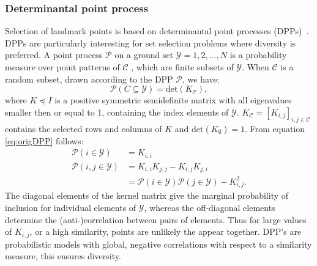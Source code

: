 \documentclass[preprint,12pt]{elsarticle}
\begin{document}
	\subsubsection{Determinantal point process}
	Selection of landmark points is based on determinantal point processes (DPPs)~\cite{kulesza2012determinantal}. DPPs are particularly interesting for set selection problems where diversity is preferred. A point process $\mathcal{P}$ on a ground set $\mathcal{Y} = {1,2,...,N}$ is a probability measure over point patterns of $\mathcal{C}$ , which are finite subsets of $\mathcal{Y}$. When $\mathcal{C}$ is a random subset, drawn according to the DPP $\mathcal{P}$, we have:
	\begin{equation}
	\label{eq:origDPP}
	\mathcal{P}(C \subseteq \mathcal{Y}) = \mathrm{det}(K_{\mathcal{C}}),
	\end{equation}
	where $K \preceq I$ is a positive symmetric semidefinite matrix with all eigenvalues smaller then or equal to 1, containing the index elements of $\mathcal{Y}$. $K_{\mathcal{C}} = [K_{i,j}]_{i,j \in \mathcal{C}}$ contains the selected rows and columns of $K$ and $\mathrm{det}(K_{\emptyset}) = 1$. From equation \eqref{eq:origDPP} follows:
	\begin{align}
	\mathcal{P}(i \in \mathcal{Y}) &= K_{i,i} \\
	\mathcal{P}(i,j \in \mathcal{Y}) &= K_{i,i}K_{j,j} - K_{i,j}K_{j,i}\\
	\label{eq:KDPP}
	&= \mathcal{P}(i \in \mathcal{Y})\mathcal{P}(j \in \mathcal{Y}) - K_{i,j}^2.
	\end{align}
	The diagonal elements of the kernel matrix give the marginal probability of inclusion for individual elements of $\mathcal{Y}$, whereas the off-diagonal elements determine the (anti-)correlation between pairs of elements. Thus for large values of $K_{i,j}$, or a high similarity, points are unlikely the appear together. DPP's are probabilistic models with global, negative correlations with respect to a similarity measure, this ensures diversity.
	
\end{document}
